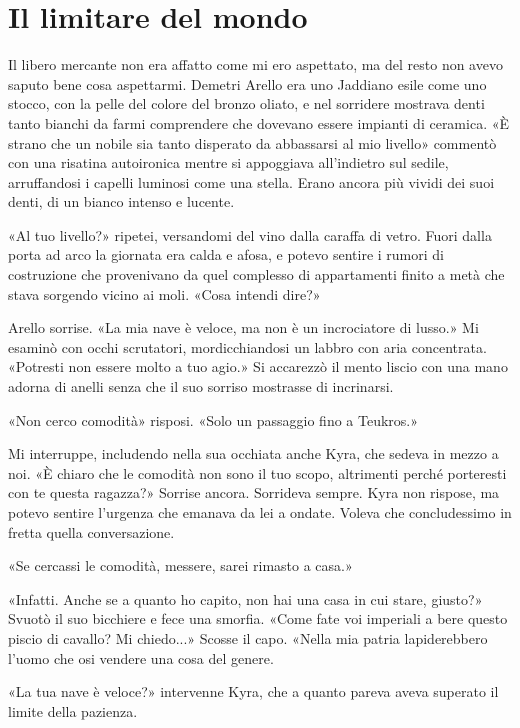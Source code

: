 \chapter{Il limitare del mondo}

Il libero mercante non era affatto come mi ero aspettato, ma del resto
non avevo saputo bene cosa aspettarmi. Demetri Arello era uno Jaddiano
esile come uno stocco, con la pelle del colore del bronzo oliato, e nel
sorridere mostrava denti tanto bianchi da farmi comprendere che dovevano
essere impianti di ceramica. «È strano che un nobile sia tanto disperato
da abbassarsi al mio livello» commentò con una risatina autoironica
mentre si appoggiava all'indietro sul sedile, arruffandosi i capelli
luminosi come una stella. Erano ancora più vividi dei suoi denti, di un
bianco intenso e lucente.

«Al tuo livello?» ripetei, versandomi del vino dalla caraffa di vetro.
Fuori dalla porta ad arco la giornata era calda e afosa, e potevo
sentire i rumori di costruzione che provenivano da quel complesso di
appartamenti finito a metà che stava sorgendo vicino ai moli. «Cosa
intendi dire?»

Arello sorrise. «La mia nave è veloce, ma non è un incrociatore di
lusso.» Mi esaminò con occhi scrutatori, mordicchiandosi un labbro con
aria concentrata. «Potresti non essere molto a tuo agio.» Si accarezzò
il mento liscio con una mano adorna di anelli senza che il suo sorriso
mostrasse di incrinarsi.

«Non cerco comodità» risposi. «Solo un passaggio fino a Teukros.»

Mi interruppe, includendo nella sua occhiata anche Kyra, che sedeva in
mezzo a noi. «È chiaro che le comodità non sono il tuo scopo, altrimenti
perché porteresti con te questa ragazza?» Sorrise ancora. Sorrideva
sempre. Kyra non rispose, ma potevo sentire l'urgenza che emanava da lei
a ondate. Voleva che concludessimo in fretta quella conversazione.

«Se cercassi le comodità, messere, sarei rimasto a casa.»

«Infatti. Anche se a quanto ho capito, non hai una casa in cui stare,
giusto?» Svuotò il suo bicchiere e fece una smorfia. «Come fate voi
imperiali a bere questo piscio di cavallo? Mi chiedo...» Scosse il capo.
«Nella mia patria lapiderebbero l'uomo che osi vendere una cosa del
genere.

«La tua nave è veloce?» intervenne Kyra, che a quanto pareva aveva
superato il limite della pazienza.

